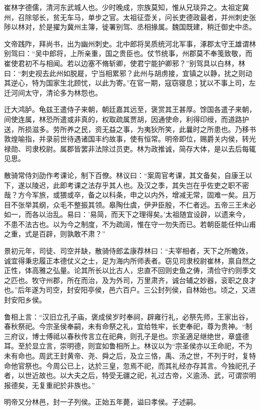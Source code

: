 \documentclass[12pt,UTF8]{ctexbook}
\begin{document}
崔林字德儒，清河东武城人也。少时晚成，宗族莫知，惟从兄琰异之。太祖定冀州，召除邬长，贫无车马，单步之官。太祖征壶关，问长吏德政最者，并州刺史张陟以林对，於是擢为冀州主簿，徙署别驾、丞相掾属。魏国既建，稍迁御史中丞。

文帝践阼，拜尚书，出为幽州刺史。北中郎将吴质统河北军事，涿郡太守王雄谓林别驾曰：“吴中郎将，上所亲重，国之贵臣也。仗节统事，州郡莫不奉笺致敬，而崔使君初不与相闻。若以边塞不脩斩卿，使君宁能护卿邪？”别驾具以白林，林曰：“刺史视去此州如脱屣，宁当相累邪？此州与胡虏接，宜镇之以静，扰之则动其逆心，特为国家生北顾忧，以此为寄。”在官一期，寇窃寝息；犹以不事上司，左迁河间太守，清论多为林怨也。

迁大鸿胪。龟兹王遣侍子来朝，朝廷嘉其远至，褒赏其王甚厚。馀国各遣子来朝，间使连属，林恐所遣或非真的，权取疏属贾胡，因通使命，利得印绶，而道路护送，所损滋多。劳所养之民，资无益之事，为夷狄所笑，此曩时之所患也。乃移书敦煌喻指，并录前世待遇诸国丰约故事，使有恒常。明帝即位，赐爵关内侯，转光禄勋、司隶校尉。属郡皆罢非法除过员吏。林为政推诚，简存大体，是以去后每辄见思。

散骑常侍刘劭作考课论，制下百僚。林议曰：“案周官考课，其文备矣，自康王以下，遂以陵迟，此即考课之法存乎其人也。及汉之季，其失岂在乎佐吏之职不密哉？方今军旅，或猥或卒，备之以科条，申之以内外，增减无常，固难一矣。且万目不张举其纲，众毛不整振其领。皋陶仕虞，伊尹臣殷，不仁者远。五帝三王未必如一，而各以治乱。易曰：'易简，而天下之理得矣。'太祖随宜设辟，以遗来今，不患不法古也。以为今之制度，不为疏阔，惟在守一勿失而已。若朝臣能任仲山甫之重，式是百辟，则孰敢不肃？”

景初元年，司徒、司空并缺，散骑侍郎孟康荐林曰：“夫宰相者，天下之所瞻效，诚宜得秉忠履正本德仗义之士，足为海内所师表者。窃见司隶校尉崔林，禀自然之正性，体高雅之弘量。论其所长以比古人，忠直不回则史鱼之俦，清俭守约则季文之匹也。牧守州郡，所在而治，及为外司，万里肃齐，诚台辅之妙器，衮职之良才也。”后年遂为司空，封安阳亭侯，邑六百户。三公封列侯，自林始也。顷之，又进封安阳乡侯。

鲁相上言：“汉旧立孔子庙，褒成侯岁时奉祠，辟雍行礼，必祭先师，王家出谷，春秋祭祀。今宗圣侯奉嗣，未有命祭之礼，宜给牲牢，长吏奉祀，尊为贵神。“制三府议，博士傅祗以春秋传言立在祀典，则孔子是也。宗圣適足继绝世，章盛德耳。至於显立言，崇明德，则宜如鲁相所上。林议以为“宗圣侯亦以王命祀，不为未有命也。周武王封黄帝、尧、舜之后，及立三恪，禹、汤之世，不列于时，复特命他官祭也。今周公已上，达於三皇，忽焉不祀，而其礼经亦存其言。今独祀孔子者，以世近故也。以大夫之后，特受无疆之祀，礼过古帝，义逾汤、武，可谓崇明报德矣，无复重祀於非族也。”

明帝又分林邑，封一子列侯。正始五年薨，谥曰孝侯。子述嗣。
\end{document}
